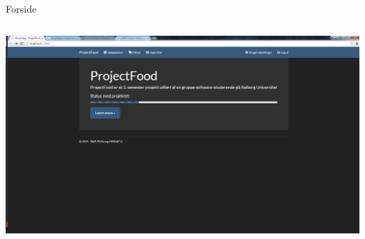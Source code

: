 \begin{frame}{Forside}
	
	\begin{minipage}[0.3\textheight]{\textwidth}
	\begin{columns}[T]
	\begin{column}{1\textwidth}
	 \includegraphics[width=1\textwidth,height=1\textheight,keepaspectratio, trim={1cm 0 0 16mm}, clip]{images/Screenshots/FrontPageOld.png}
	
	\end{column}

	\end{columns}

  \end{minipage}
	
\end{frame}


